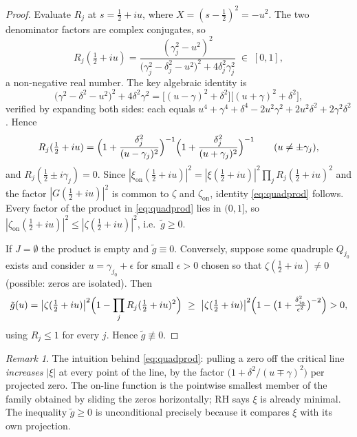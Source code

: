 \documentclass[11pt]{amsart}
\theoremstyle{definition}
\theoremstyle{remark}
\newtheorem{remark}[theorem]{Remark}
\newcommand{\zon}{\zeta_{\mathrm{on}}}
\newcommand{\xon}{\xi_{\mathrm{on}}}
\begin{document}
\begin{proof}
Evaluate $R_j$ at $s=\tfrac12+iu$, where $X=(s-\tfrac12)^{2}=-u^{2}$. The
two denominator factors are complex conjugates, so
\[
R_j(\tfrac12+iu)
=\frac{(\gamma_j^{2}-u^{2})^{2}}
{\bigl(\gamma_j^{2}-\delta_j^{2}-u^{2}\bigr)^{2}+4\delta_j^{2}\gamma_j^{2}}
\;\in\;[0,1],
\]
a non-negative real number. The key algebraic identity is
\begin{equation}\label{eq:keyidentity}
\bigl(\gamma^{2}-\delta^{2}-u^{2}\bigr)^{2}+4\delta^{2}\gamma^{2}
=\bigl[(u-\gamma)^{2}+\delta^{2}\bigr]\bigl[(u+\gamma)^{2}+\delta^{2}\bigr],
\end{equation}
verified by expanding both sides:
each equals
$u^{4}+\gamma^{4}+\delta^{4}-2u^{2}\gamma^{2}+2u^{2}\delta^{2}
+2\gamma^{2}\delta^{2}$. Hence
\[
R_j(\tfrac12+iu)
=\Bigl(1+\frac{\delta_j^{2}}{(u-\gamma_j)^{2}}\Bigr)^{-1}
 \Bigl(1+\frac{\delta_j^{2}}{(u+\gamma_j)^{2}}\Bigr)^{-1}
\qquad(u\neq\pm\gamma_j),
\]
and $R_j(\tfrac12\pm i\gamma_j)=0$. Since
$|\xon(\tfrac12+iu)|^{2}=|\xi(\tfrac12+iu)|^{2}\prod_jR_j(\tfrac12+iu)^{2}$
and the factor $|G(\tfrac12+iu)|^{2}$ is common to $\zeta$ and $\zon$,
identity \eqref{eq:quadprod} follows. Every factor of the product in
\eqref{eq:quadprod} lies in $(0,1]$, so
$|\zon(\tfrac12+iu)|^{2}\le|\zeta(\tfrac12+iu)|^{2}$, i.e.\ $\tilde g\ge0$.

If $J=\emptyset$ the product is empty and $\tilde g\equiv0$. Conversely,
suppose some quadruple $Q_{j_0}$ exists and consider
$u=\gamma_{j_0}+\epsilon$ for small $\epsilon>0$ chosen so that
$\zeta(\tfrac12+iu)\neq0$ (possible: zeros are isolated). Then
\[
\tilde g(u)
=\bigl|\zeta(\tfrac12+iu)\bigr|^{2}
\Bigl(1-\prod_jR_j(\tfrac12+iu)^{2}\Bigr)
\ \ge\
\bigl|\zeta(\tfrac12+iu)\bigr|^{2}
\Bigl(1-\bigl(1+\tfrac{\delta_{j_0}^{2}}{\epsilon^{2}}\bigr)^{-2}\Bigr)
>0,
\]
using $R_j\le1$ for every $j$. Hence $\tilde g\not\equiv0$.
\end{proof}

\begin{remark}
The intuition behind \eqref{eq:quadprod}: pulling a zero off the critical
line \emph{increases} $|\xi|$ at every point of the line, by the factor
$\bigl(1+\delta^{2}/(u\mp\gamma)^{2}\bigr)$ per projected zero. The on-line
function is the pointwise smallest member of the family obtained by sliding
the zeros horizontally; RH says $\xi$ is already minimal. The inequality
$\tilde g\ge0$ is unconditional precisely because it compares $\xi$ with its
own projection.
\end{remark}
\end{document}
